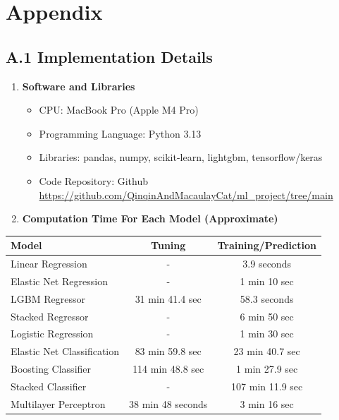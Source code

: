 \documentclass[12pt]{article}
\begin{document}
\newpage
\appendix
\section{Appendix}

\subsection{A.1 Implementation Details}

\begin{enumerate}
    \item \textbf{Software and Libraries}
    \begin{itemize}
        \item CPU: MacBook Pro (Apple M4 Pro)
        \item Programming Language: Python 3.13
        \item Libraries: pandas, numpy, scikit-learn, lightgbm, tensorflow/keras
        \item Code Repository: Github \url{https://github.com/QinqinAndMacaulayCat/ml_project/tree/main}
    \end{itemize}

    \item \textbf{Computation Time For Each Model (Approximate)}
\end{enumerate}

\begin{singlespace}
\begin{table}[H]
\centering
\begin{tabular}{lcc}
\toprule
\textbf{Model} & \textbf{Tuning} & \textbf{Training/Prediction} \\
\midrule
Linear Regression & - & 3.9 seconds \\
Elastic Net Regression & - & 1 min 10 sec \\
LGBM Regressor & 31 min 41.4 sec & 58.3 seconds \\
Stacked Regressor & - & 6 min 50 sec \\
Logistic Regression & - & 1 min 30 sec \\
Elastic Net Classification & 83 min 59.8 sec & 23 min 40.7 sec \\
Boosting Classifier & 114 min 48.8 sec & 1 min 27.9 sec \\
Stacked Classifier & - & 107 min 11.9 sec \\
Multilayer Perceptron & 38 min 48 seconds & 3 min 16 sec \\
\bottomrule
\end{tabular}
\end{table}
\end{singlespace}
\end{document}
